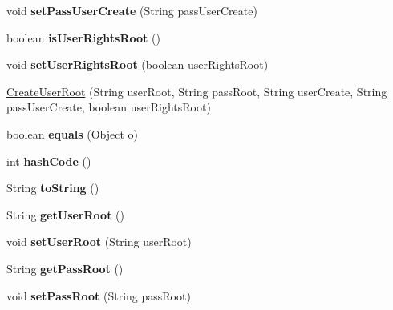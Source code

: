 \begin{DoxyCompactItemize}
\mbox{\label{class_create_user_root_a1fa56655ebc5cfce86df78429d22a22b}} 
void {\bfseries set\+Pass\+User\+Create} (String pass\+User\+Create)
\item 
\mbox{\label{class_create_user_root_a46105498a89702d50c7ee93b000878cc}} 
boolean {\bfseries is\+User\+Rights\+Root} ()
\item 
\mbox{\label{class_create_user_root_a20fbe3d3cda3ea5bcbc238e4baab039d}} 
void {\bfseries set\+User\+Rights\+Root} (boolean user\+Rights\+Root)
\item 
\hyperlink{class_create_user_root_a089337f6faedcd6f4850ac9bf60c7d85}{Create\+User\+Root} (String user\+Root, String pass\+Root, String user\+Create, String pass\+User\+Create, boolean user\+Rights\+Root)
\item 
\mbox{\label{class_create_user_root_ad00b10c9a8ea120dbef823e1cbf2961d}} 
boolean {\bfseries equals} (Object o)
\item 
\mbox{\label{class_create_user_root_a20b56a7302f659762a408ee77f94ce7f}} 
int {\bfseries hash\+Code} ()
\item 
\mbox{\label{class_create_user_root_a162c5272b7e633c81aca4077088eeccb}} 
String {\bfseries to\+String} ()
\item 
\mbox{\label{class_create_user_root_ad3a6203b1afee594d5e0214b721bbabd}} 
String {\bfseries get\+User\+Root} ()
\item 
\mbox{\label{class_create_user_root_a1ef78fab3a8f64515e47e133a5e40a00}} 
void {\bfseries set\+User\+Root} (String user\+Root)
\item 
\mbox{\label{class_create_user_root_a2e2dd9b254a65fad94d21b811a3dbd55}} 
String {\bfseries get\+Pass\+Root} ()
\item 
\mbox{\label{class_create_user_root_a1ec9f4160b07eb21578fc405a5e9fca2}} 
void {\bfseries set\+Pass\+Root} (String pass\+Root)
\item 

\end{DoxyCompactItemize}
